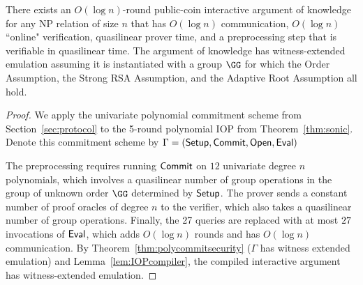 \begin{theorem}
There exists an $O(\log n)$-round public-coin interactive argument of knowledge for any NP relation of size $n$ that has $O(\log n)$ communication, $O(\log n)$ ``online" verification, quasilinear prover time, and a preprocessing step that is verifiable in quasilinear time. The argument of knowledge has witness-extended emulation assuming it is instantiated with a group $\GG$ for which the Order Assumption, the Strong RSA Assumption, and the Adaptive Root Assumption all hold. 
\end{theorem}
\begin{proof}
We apply the univariate polynomial commitment scheme from Section~\ref{sec:protocol} to the 5-round polynomial IOP from Theorem~\ref{thm:sonic}. Denote this commitment scheme by $\Gamma = (\textsf{{Setup}}, \textsf{{Commit}}, \textsf{{Open}}, \textsf{{Eval}})$ 

The preprocessing requires running $\textsf{{Commit}}$ on $12$ univariate degree $n$ polynomials, which involves a quasilinear number of group operations in the group of unknown order $\GG$ determined by $\textsf{{Setup}}$. The prover sends a constant number of proof oracles of degree $n$ to the verifier, which also takes a quasilinear number of group operations. Finally, the 27 queries are replaced with at most $27$ invocations of $\textsf{{Eval}}$, which adds $O(\log n )$ rounds and has $O(\log n)$ communication. By Theorem~\ref{thm:polycommitsecurity} ($\Gamma$ has witness extended emulation) and Lemma~\ref{lem:IOPcompiler}, the compiled interactive argument has witness-extended emulation.

\end{proof}

